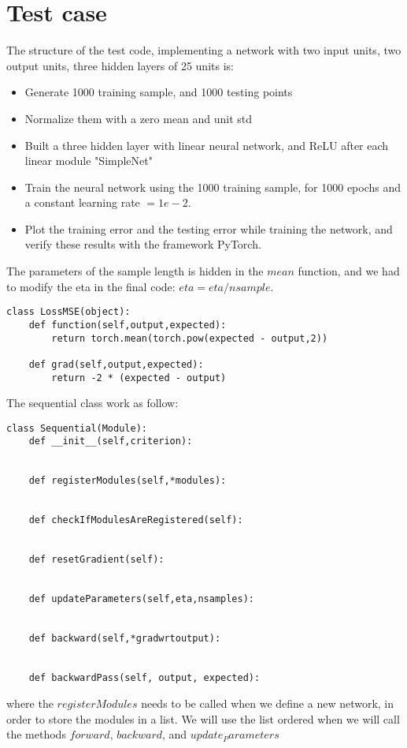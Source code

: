 \documentclass[10pt,final,a4paper]{article}
\begin{document}
\section{Test case}
The structure of the test code, implementing a network with two input units, two output units, three hidden layers of 25 units is:
\begin{itemize}
\item Generate 1000 training sample, and 1000 testing points\\
\item Normalize them with a zero mean and unit std\\
\item Built a three hidden layer with linear neural network, and ReLU after each linear module "SimpleNet"\\
\item Train the neural network using the 1000 training sample, for 1000 epochs and a constant learning rate $=1e-2$.
\item Plot the training error and the testing error while training the network, and verify these results with the framework PyTorch.
\end{itemize}

The parameters of the sample length is hidden in the $mean$ function, and we had to modify the eta in the final code: $eta=eta/nsample$.
\begin{verbatim}
class LossMSE(object):
    def function(self,output,expected):
        return torch.mean(torch.pow(expected - output,2))

    def grad(self,output,expected):
        return -2 * (expected - output)
\end{verbatim}

The sequential class work as follow:
\begin{verbatim}
class Sequential(Module):
    def __init__(self,criterion):


    def registerModules(self,*modules):


    def checkIfModulesAreRegistered(self):


    def resetGradient(self):


    def updateParameters(self,eta,nsamples):


    def backward(self,*gradwrtoutput):


    def backwardPass(self, output, expected):

\end{verbatim}
where the $registerModules$ needs to be called when we define a new network, in order to store the modules in a list. We will use the list ordered when we will call the methods $forward$, $backward$, and $update_Parameters$

 
\end{document}
